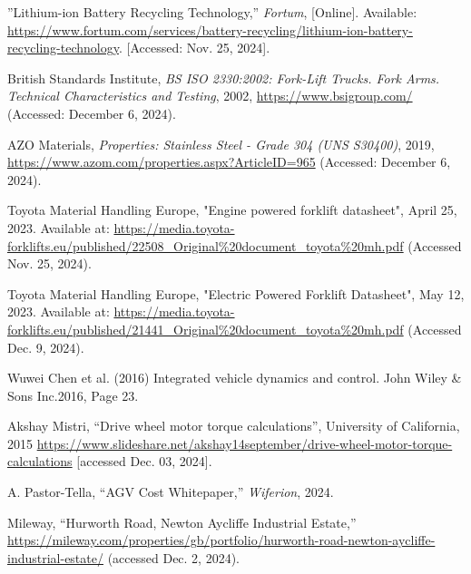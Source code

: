 \documentclass[12pt,titlepage]{article}
\begin{document}
\begin{thebibliography}{99}
''Lithium-ion Battery Recycling Technology,''
\textit{Fortum}, [Online]. Available: \url{https://www.fortum.com/services/battery-recycling/lithium-ion-battery-recycling-technology}. [Accessed: Nov. 25, 2024].

British Standards Institute, \textit{BS ISO 2330:2002: Fork-Lift Trucks. Fork Arms. Technical Characteristics and Testing}, 2002, \url{https://www.bsigroup.com/} (Accessed: December 6, 2024).

AZO Materials, \textit{Properties: Stainless Steel - Grade 304 (UNS S30400)}, 2019, \url{https://www.azom.com/properties.aspx?ArticleID=965} (Accessed: December 6, 2024).

Toyota Material Handling Europe, "Engine powered forklift datasheet", April 25, 2023. Available at: \url{https://media.toyota-forklifts.eu/published/22508_Original%20document_toyota%20mh.pdf} (Accessed Nov. 25, 2024).

Toyota Material Handling Europe, "Electric Powered Forklift Datasheet", May 12, 2023. Available at: \url{https://media.toyota-forklifts.eu/published/21441_Original%20document_toyota%20mh.pdf} (Accessed Dec. 9, 2024).

 Wuwei Chen et al. (2016) Integrated vehicle dynamics and control. John Wiley \& Sons Inc.2016, Page 23.

Akshay Mistri, “Drive wheel motor torque calculations”, University of California, 2015 \url{https://www.slideshare.net/akshay14september/drive-wheel-motor-torque-calculations} [accessed Dec. 03, 2024].

A. Pastor-Tella, ``AGV Cost Whitepaper,'' \textit{Wiferion}, 2024.

Mileway, “Hurworth Road, Newton Aycliffe Industrial Estate,” \url{https://mileway.com/properties/gb/portfolio/hurworth-road-newton-aycliffe-industrial-estate/} (accessed Dec. 2, 2024).

\end{thebibliography}

 
\end{document}

